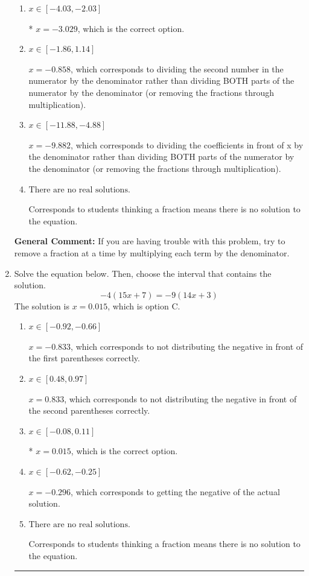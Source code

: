 \documentclass{extbook}[14pt]
\newcommand{\litem}[1]{\item #1

\rule{\textwidth}{0.4pt}}
\begin{document}
\begin{enumerate}
{\begin{enumerate}[label=\Alph*.]
 $x = 3.324$, which corresponds to not distributing the negative in front of the second fraction.
\item \( x \in [-4.03, -2.03] \)

* $x = -3.029$, which is the correct option.
\item \( x \in [-1.86, 1.14] \)

 $x = -0.858$, which corresponds to dividing the second number in the numerator by the denominator rather than dividing BOTH parts of the numerator by the denominator (or removing the fractions through multiplication).
\item \( x \in [-11.88, -4.88] \)

 $x = -9.882$, which corresponds to dividing the coefficients in front of x by the denominator rather than dividing BOTH parts of the numerator by the denominator (or removing the fractions through multiplication).
\item \( \text{There are no real solutions.} \)

Corresponds to students thinking a fraction means there is no solution to the equation.
\end{enumerate}

\textbf{General Comment:} If you are having trouble with this problem, try to remove a fraction at a time by multiplying each term by the denominator.
}
\litem{
Solve the equation below. Then, choose the interval that contains the solution.
\[ -4(15x + 7) = -9(14x + 3) \]The solution is \( x = 0.015 \), which is option C.\begin{enumerate}[label=\Alph*.]
\item \( x \in [-0.92, -0.66] \)

$x = -0.833$, which corresponds to not distributing the negative in front of the first parentheses correctly.
\item \( x \in [0.48, 0.97] \)

$x = 0.833$, which corresponds to not distributing the negative in front of the second parentheses correctly.
\item \( x \in [-0.08, 0.11] \)

* $x = 0.015$, which is the correct option.
\item \( x \in [-0.62, -0.25] \)

$x = -0.296$, which corresponds to getting the negative of the actual solution.
\item \( \text{There are no real solutions.} \)

Corresponds to students thinking a fraction means there is no solution to the equation.
\end{enumerate}

}
\end{enumerate}
\end{document}
